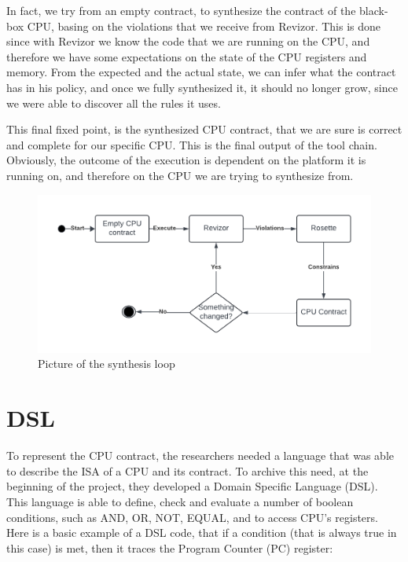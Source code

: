In fact, we try from an empty contract, to synthesize the contract of the black-box
CPU, basing on the violations that we receive from Revizor. This is done since
with Revizor we know the code that we are running on the CPU, and therefore we have
some expectations on the state of the CPU registers and memory. From the
expected and the actual state, we can infer what the contract has in his policy,
and once we fully synthesized it, it should no longer grow, since we were able
to discover all the rules it uses.

This final fixed point, is the synthesized CPU contract, that we are sure is
correct and complete for our specific CPU. This is the final output of the tool chain.
Obviously, the outcome of the execution is dependent on the platform it is running
on, and therefore on the CPU we are trying to synthesize from.

\begin{figure}
  \begin{center}
    \includegraphics{images/Thesis.png}
  \end{center}
  \caption{Picture of the synthesis loop}
  \label{loop}
\end{figure}
\section{DSL}
\label{cha:DSL} To represent the CPU contract, the researchers needed a language
that was able to describe the ISA of a CPU and its contract. To archive this
need, at the beginning of the project, they developed a Domain Specific Language
(DSL). This language is able to define, check and evaluate a number of boolean
conditions, such as AND, OR, NOT, EQUAL, and to access CPU's registers. Here is
a basic example of a DSL code, that if a condition (that is always true in this
case) is met, then it traces the Program Counter (PC) register:

